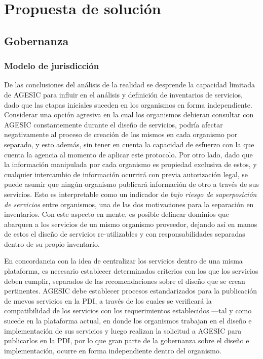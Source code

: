 \chapter{Propuesta de solución}
\label{Solucion}

\section{Gobernanza}
  \label{Solucion:Gobernanza}

  \subsection{Modelo de jurisdicción}
    \label{Solucion:Gobernanza:ModeloJurisdiccion}
    De las conclusiones del análisis de la realidad se desprende la capacidad limitada de AGESIC para influir en el análisis y definición de inventarios de servicios, dado que las etapas iniciales suceden en los organismos en forma independiente. Considerar una opción agresiva en la cual los organismos debieran consultar con AGESIC constantemente durante el diseño de servicios, podría afectar negativamente al proceso de creación de los mismos en cada organismo por separado, y esto además, sin tener en cuenta la capacidad de esfuerzo con la que cuenta la agencia al momento de aplicar este protocolo. Por otro lado, dado que la información manipulada por cada organismo es propiedad exclusiva de estos, y cualquier intercambio de información ocurrirá con previa autorización legal, se puede asumir que ningún organismo publicará información de otro a través de sus servicios. Esto es interpretable como un indicador de \emph{bajo riesgo de superposición de servicios} entre organismos, una de las dos motivaciones para la separación en inventarios. Con este aspecto en mente, es posible delinear dominios que abarquen a los servicios de un mismo organismo proveedor, dejando así en manos de estos el diseño de servicios re-utilizables y con responsabilidades separadas dentro de su propio inventario.

    En concordancia con la idea de centralizar los servicios dentro de una misma plataforma, es necesario establecer determinados criterios con los que los servicios deben cumplir, separados de las recomendaciones sobre el diseño que se crean pertinentes. AGESIC debe establecer procesos estandarizados para la publicación de nuevos servicios en la PDI, a través de los cuales se verificará la compatibilidad de los servicios con los requerimientos establecidos —tal y como sucede en la plataforma actual, en donde los organismos trabajan en el diseño e implementación de sus servicios y luego realizan la solicitud a AGESIC para publicarlos en la PDI, por lo que gran parte de la gobernanza sobre el diseño e implementación, ocurre en forma independiente dentro del organismo.

